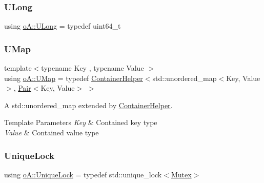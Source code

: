 \subsubsection{\texorpdfstring{U\+Long}{ULong}}
{\footnotesize\ttfamily using \mbox{\hyperlink{namespaceo_a_aeb20ba1e00df0faadde3654ff7d8c4e7}{o\+A\+::\+U\+Long}} = typedef uint64\+\_\+t}

\mbox{\label{namespaceo_a_a7541113114ad6ecaa07c0228d7e23ed7}} 
\subsubsection{\texorpdfstring{U\+Map}{UMap}}
{\footnotesize\ttfamily template$<$typename Key , typename Value $>$ \\
using \mbox{\hyperlink{namespaceo_a_a7541113114ad6ecaa07c0228d7e23ed7}{o\+A\+::\+U\+Map}} = typedef \mbox{\hyperlink{classo_a_1_1_container_helper}{Container\+Helper}}$<$std\+::unordered\+\_\+map$<$Key, Value$>$, \mbox{\hyperlink{namespaceo_a_a2e4add9f777dcae3f5afde9e90c75b66}{Pair}}$<$Key, Value$>$ $>$}



A std\+::unordered\+\_\+map extended by \mbox{\hyperlink{classo_a_1_1_container_helper}{Container\+Helper}}. 


\begin{DoxyTemplParams}{Template Parameters}
{\em Key} & Contained key type \\
\hline
{\em Value} & Contained value type \\
\hline
\end{DoxyTemplParams}
\mbox{\label{namespaceo_a_a2a6e84e4843983460eace0e5ae899a1e}} 
\subsubsection{\texorpdfstring{Unique\+Lock}{UniqueLock}}
{\footnotesize\ttfamily using \mbox{\hyperlink{namespaceo_a_a2a6e84e4843983460eace0e5ae899a1e}{o\+A\+::\+Unique\+Lock}} = typedef std\+::unique\+\_\+lock$<$\mbox{\hyperlink{namespaceo_a_adc2c4dfe90e78df47ae2e677a4d0f9fa}{Mutex}}$>$}

\mbox{\label{namespaceo_a_a0e8a8217ae95045f36575875dcb54537}} 
